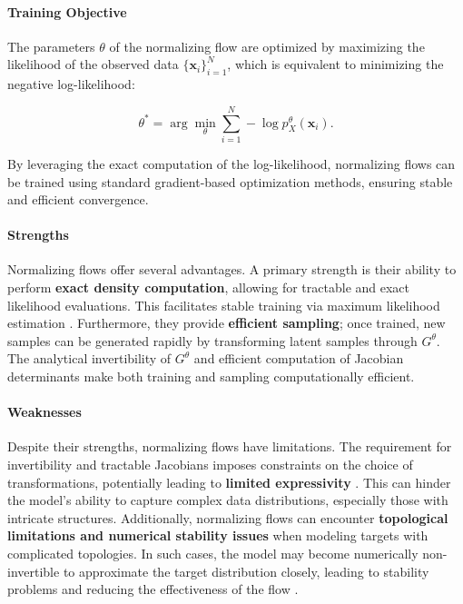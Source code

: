 \paragraph{Training Objective}

The parameters $\theta$ of the normalizing flow are optimized by maximizing the likelihood of the observed data $\{\mathbf{x}_i\}_{i=1}^N$, which is equivalent to minimizing the negative log-likelihood:

\[
\theta^* = \arg \min_{\theta} \sum_{i=1}^N -\log p^\theta_X(\mathbf{x}_i).
\]

By leveraging the exact computation of the log-likelihood, normalizing flows can be trained using standard gradient-based optimization methods, ensuring stable and efficient convergence.

\paragraph{Strengths}

Normalizing flows offer several advantages. A primary strength is their ability to perform \textbf{exact density computation}, allowing for tractable and exact likelihood evaluations. This facilitates stable training via maximum likelihood estimation \cite{papamakarios2019normalizing}. Furthermore, they provide \textbf{efficient sampling}; once trained, new samples can be generated rapidly by transforming latent samples through \( G^\theta \). The analytical invertibility of \( G^\theta \) and efficient computation of Jacobian determinants make both training and sampling computationally efficient.

\paragraph{Weaknesses}

Despite their strengths, normalizing flows have limitations. The requirement for invertibility and tractable Jacobians imposes constraints on the choice of transformations, potentially leading to \textbf{limited expressivity} \cite{papamakarios2019normalizing}. This can hinder the model's ability to capture complex data distributions, especially those with intricate structures. Additionally, normalizing flows can encounter \textbf{topological limitations and numerical stability issues} when modeling targets with complicated topologies. In such cases, the model may become numerically non-invertible to approximate the target distribution closely, leading to stability problems and reducing the effectiveness of the flow \cite{behrmann2021understanding, cornish2020relaxing}. 

